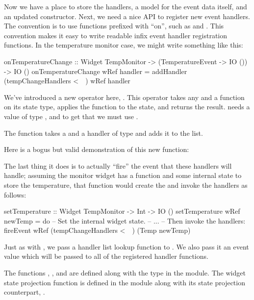 Now we have a place to store the handlers, a model for the event data
itself, and an updated constructor.  Next, we need a nice API to
register new event handlers.  The  convention is to use
functions prefixed with ``on'', such as  and
.  This convention makes it easy to write readable
infix event handler registration functions.  In the temperature
monitor case, we might write something like this:

\begin{haskellcode}
 onTemperatureChange :: Widget TempMonitor
                     -> (TemperatureEvent -> IO ())
                     -> IO ()
 onTemperatureChange wRef handler =
   addHandler (tempChangeHandlers <~~) wRef handler
\end{haskellcode}

We've introduced a new operator here, \fw{<\string~\string~}.  This
operator takes any  and a function on its state type,
applies the function to the state, and returns the result.
 needs a value of type , and to get that we must use
\fw{<\string~\string~}.

The  function takes a  and a handler of
type  and adds it to the  list.

Here is a bogus but valid demonstration of this new function:


The last thing it does is to actually ``fire'' the event that these
handlers will handle; assuming the monitor widget has a
 function and some internal state to store the
temperature, that function would create the  and
invoke the handlers as follows:

\begin{haskellcode}
 setTemperature :: Widget TempMonitor -> Int -> IO ()
 setTemperature wRef newTemp = do
   -- Set the internal widget state.
   -- ...
   -- Then invoke the handlers:
   fireEvent wRef (tempChangeHandlers <~~) (Temp newTemp)
\end{haskellcode}

Just as with , we pass a handler list lookup function
to .  We also pass it an event value which will be
passed to all of the registered handler functions.

The functions , , and 
are defined along with the  type in the 
module.  The widget state projection function \fw{<\string~\string~}
is defined in the  module along with its 
state projection counterpart, \fw{<\string~}.
